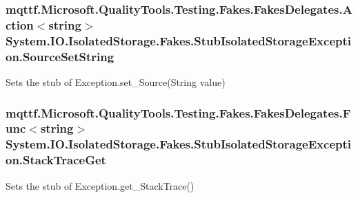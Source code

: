 \hypertarget{class_system_1_1_i_o_1_1_isolated_storage_1_1_fakes_1_1_stub_isolated_storage_exception_ac9e939198c26b62e155d74796364d795}{
\subsubsection[{Source\-Set\-String}]{\setlength{\rightskip}{0pt plus 5cm}mqttf.\-Microsoft.\-Quality\-Tools.\-Testing.\-Fakes.\-Fakes\-Delegates.\-Action$<$string$>$ System.\-I\-O.\-Isolated\-Storage.\-Fakes.\-Stub\-Isolated\-Storage\-Exception.\-Source\-Set\-String}}\label{class_system_1_1_i_o_1_1_isolated_storage_1_1_fakes_1_1_stub_isolated_storage_exception_ac9e939198c26b62e155d74796364d795}


Sets the stub of Exception.\-set\-\_\-\-Source(\-String value)

\hypertarget{class_system_1_1_i_o_1_1_isolated_storage_1_1_fakes_1_1_stub_isolated_storage_exception_a88e2bc0c69d47dcc602e6ac8debee6b2}{
\subsubsection[{Stack\-Trace\-Get}]{\setlength{\rightskip}{0pt plus 5cm}mqttf.\-Microsoft.\-Quality\-Tools.\-Testing.\-Fakes.\-Fakes\-Delegates.\-Func$<$string$>$ System.\-I\-O.\-Isolated\-Storage.\-Fakes.\-Stub\-Isolated\-Storage\-Exception.\-Stack\-Trace\-Get}}\label{class_system_1_1_i_o_1_1_isolated_storage_1_1_fakes_1_1_stub_isolated_storage_exception_a88e2bc0c69d47dcc602e6ac8debee6b2}


Sets the stub of Exception.\-get\-\_\-\-Stack\-Trace()

